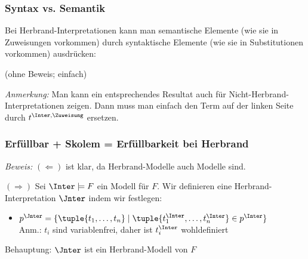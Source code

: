 \documentclass[aspectratio=1610,onlymath]{beamer}
\begin{document}
\begin{frame}\frametitle{Syntax vs. Semantik}

Bei Herbrand-Interpretationen kann man semantische Elemente (wie sie in Zuweisungen vorkommen) durch syntaktische Elemente (wie sie in Substitutionen vorkommen) ausdrücken:\medskip


(ohne Beweis; einfach)
\bigskip

{\color{devilscss}\footnotesize \emph{Anmerkung:} Man kann ein entsprechendes Resultat auch für Nicht-Herbrand-Interpretationen zeigen. Dann muss man einfach den Term auf der linken Seite durch $t^{\Inter,\Zuweisung}$ ersetzen.}

\end{frame}

\begin{frame}\frametitle{Erfüllbar + Skolem = Erfüllbarkeit bei Herbrand}

\pause

\emph{Beweis:} $(\Leftarrow)$ ist klar, da Herbrand-Modelle auch Modelle sind.\bigskip\pause

$(\Rightarrow)$ Sei $\Inter\models F$ ein Modell für $F$. Wir definieren eine Herbrand-Interpretation $\Jnter$ indem wir festlegen:
\begin{itemize}
\item $p^\Jnter=\{\tuple{t_1,\ldots,t_n}\mid\tuple{t_1^\Inter,\ldots,t_n^\Inter}\in p^\Inter\}$\\
{\footnotesize Anm.: $t_i$ sind variablenfrei, daher ist $t_i^\Inter$ wohldefiniert}
\end{itemize}
Behauptung: \alert{$\Jnter$ ist ein Herbrand-Modell von $F$}

\end{frame}
\end{document}
